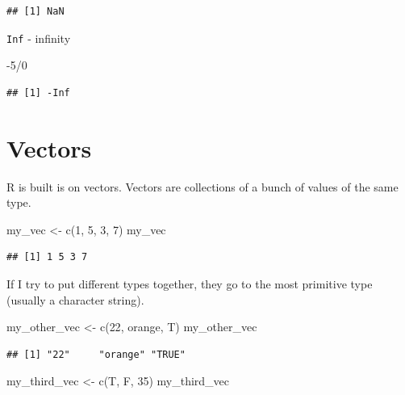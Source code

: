 \documentclass[
]{book}
\newenvironment{Shaded}{\begin{snugshade}}{\end{snugshade}}
\newcommand{\DecValTok}[1]{\textcolor[rgb]{0.00,0.00,0.81}{#1}}
\newcommand{\FunctionTok}[1]{\textcolor[rgb]{0.00,0.00,0.00}{#1}}
\newcommand{\NormalTok}[1]{#1}
\newcommand{\OtherTok}[1]{\textcolor[rgb]{0.56,0.35,0.01}{#1}}
\newcommand{\SpecialCharTok}[1]{\textcolor[rgb]{0.00,0.00,0.00}{#1}}
\newcommand{\StringTok}[1]{\textcolor[rgb]{0.31,0.60,0.02}{#1}}
\begin{document}
\begin{verbatim}
## [1] NaN
\end{verbatim}

\texttt{Inf} - infinity

\begin{Shaded}
\begin{Highlighting}[]
\SpecialCharTok{{-}}\DecValTok{5}\SpecialCharTok{/}\DecValTok{0}
\end{Highlighting}
\end{Shaded}

\begin{verbatim}
## [1] -Inf
\end{verbatim}

\hypertarget{vectors}{%
\section{Vectors}\label{vectors}}

R is built is on vectors. Vectors are collections of a bunch of values of the same type.

\begin{Shaded}
\begin{Highlighting}[]
\NormalTok{my\_vec }\OtherTok{\textless{}{-}} \FunctionTok{c}\NormalTok{(}\DecValTok{1}\NormalTok{, }\DecValTok{5}\NormalTok{, }\DecValTok{3}\NormalTok{, }\DecValTok{7}\NormalTok{)}
\NormalTok{my\_vec}
\end{Highlighting}
\end{Shaded}

\begin{verbatim}
## [1] 1 5 3 7
\end{verbatim}

If I try to put different types together, they go to the most primitive type (usually a character string).

\begin{Shaded}
\begin{Highlighting}[]
\NormalTok{my\_other\_vec }\OtherTok{\textless{}{-}} \FunctionTok{c}\NormalTok{(}\DecValTok{22}\NormalTok{, }\StringTok{\textquotesingle{}orange\textquotesingle{}}\NormalTok{, T)}
\NormalTok{my\_other\_vec}
\end{Highlighting}
\end{Shaded}

\begin{verbatim}
## [1] "22"     "orange" "TRUE"
\end{verbatim}

\begin{Shaded}
\begin{Highlighting}[]
\NormalTok{my\_third\_vec }\OtherTok{\textless{}{-}} \FunctionTok{c}\NormalTok{(T, F, }\DecValTok{35}\NormalTok{)}
\NormalTok{my\_third\_vec}
\end{Highlighting}
\end{Shaded}
\end{document}
